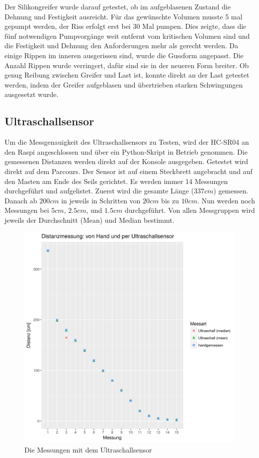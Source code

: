 Der Silikongreifer wurde darauf getestet, ob im aufgeblasenen Zustand die Dehnung und Festigkeit ausreicht. Für das gewünschte Volumen musste 5 mal gepumpt werden, der Riss erfolgt erst bei 30 Mal pumpen. Dies zeigte, dass die fünf notwendigen Pumpvorgänge weit entfernt vom kritischen Volumen sind und die Festigkeit und Dehnung den Anforderungen mehr als gerecht werden. Da einige Rippen im inneren ausgerissen sind, wurde die Gussform angepasst. Die Anzahl Rippen wurde verringert, dafür sind sie in der neueren Form breiter. Ob genug Reibung zwischen Greifer und Last ist, konnte direkt an der Last getestet werden, indem der Greifer aufgeblasen und übertrieben starken Schwingungen ausgesetzt wurde.

\subsection{Ultraschallsensor}
\label{sec:versuch-ultraschallsensor}

Um die Messgenauigkeit des Ultraschallsensors zu Testen, wird der HC-SR04 an den Raspi angeschlossen und über ein Python-Skript in Betrieb genommen. Die gemessenen Distanzen werden direkt auf der Konsole ausgegeben. Getestet wird direkt auf dem Parcours. Der Sensor ist auf einem Steckbrett angebracht und auf den Masten am Ende des Seils gerichtet.
Es werden immer 14 Messungen durchgeführt und aufgelistet. Zuerst wird die gesamte Länge ($337cm$) gemessen. Danach ab $200cm$ in jeweils in Schritten von $20cm$ bis zu $10cm$. Nun werden noch Messungen bei $5cm$, $2.5cm$, und $1.5cm$ durchgeführt. Von allen Messgruppen wird jeweils der Durchschnitt (Mean) und Median bestimmt. 

\begin{figure}[]
    \includegraphics[width=\linewidth]{graphs/ultraschall.png}
    \caption{Die Messungen mit dem Ultraschallsensor}
    \label{fig:graph-ultraschallsensor}
\end{figure}

